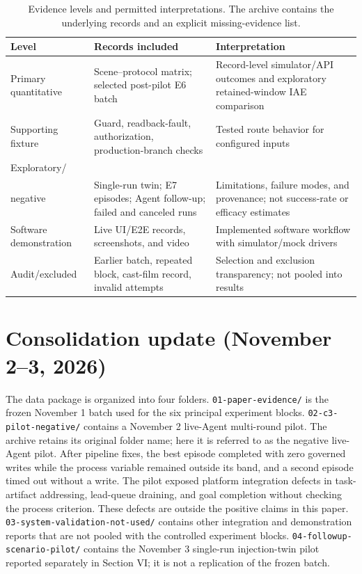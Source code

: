 \documentclass[10pt]{article}
\begin{document}
\begin{table}[htbp]
\centering
\caption{Evidence levels and permitted interpretations. The archive contains the underlying records and an explicit missing-evidence list.}
\scriptsize
\setlength{\tabcolsep}{2pt}
\begin{tabularx}{\textwidth}{@{}>{\raggedright\arraybackslash}p{2.1cm}>{\raggedright\arraybackslash}p{2.8cm}>{\raggedright\arraybackslash}X@{}}
\toprule
Level & Records included & Interpretation \\
\midrule
Primary quantitative & Scene--protocol matrix; selected post-pilot E6 batch & Record-level simulator/API outcomes and exploratory retained-window IAE comparison \\
Supporting fixture & Guard, readback-fault, authorization, production-branch checks & Tested route behavior for configured inputs \\
Exploratory/\\negative & Single-run twin; E7 episodes; Agent follow-up; failed and canceled runs & Limitations, failure modes, and provenance; not success-rate or efficacy estimates \\
Software demonstration & Live UI/E2E records, screenshots, and video & Implemented software workflow with simulator/mock drivers \\
Audit/excluded & Earlier batch, repeated block, cast-film record, invalid attempts & Selection and exclusion transparency; not pooled into results \\
\bottomrule
\end{tabularx}
\end{table}

\section*{Consolidation update (November 2--3, 2026)}
The data package is organized into four folders. \texttt{01-paper-evidence/} is the frozen November 1 batch used for the six principal experiment blocks. \texttt{02-c3-pilot-negative/} contains a November 2 live-Agent multi-round pilot. The archive retains its original folder name; here it is referred to as the negative live-Agent pilot. After pipeline fixes, the best episode completed with zero governed writes while the process variable remained outside its band, and a second episode timed out without a write. The pilot exposed platform integration defects in task-artifact addressing, lead-queue draining, and goal completion without checking the process criterion. These defects are outside the positive claims in this paper. \texttt{03-system-validation-not-used/} contains other integration and demonstration reports that are not pooled with the controlled experiment blocks. \texttt{04-followup-scenario-pilot/} contains the November 3 single-run injection-twin pilot reported separately in Section VI; it is not a replication of the frozen batch.
\end{document}
